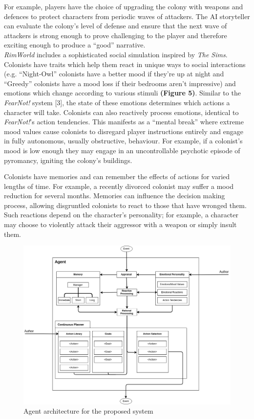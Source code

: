\documentclass{sig-alternate-05-2015}
\begin{document}
For example, players have the choice of upgrading the colony with weapons and defences to protect characters from periodic waves of attackers. The AI storyteller can evaluate the colony's level of defense and ensure that the next wave of attackers is strong enough to prove challenging to the player and therefore exciting enough to produce a ``good'' narrative.\\

\textit{RimWorld} includes a sophisticated social simulation inspired by \textit{The Sims}. Colonists have traits which help them react in unique ways to social interactions (e.g. ``Night-Owl'' colonists have a better mood if they're up at night and ``Greedy'' colonists have a mood loss if their bedrooms aren't impressive) and emotions which change according to various stimuli \textbf{(Figure 5)}. Similar to the \textit{FearNot!} system [3], the state of these emotions determines which actions a character will take. Colonists can also reactively process emotions, identical to \textit{FearNot!}'s action tendencies. This manifests as a ``mental break'' where extreme mood values cause colonists to disregard player instructions entirely and engage in fully autonomous, usually obstructive, behaviour. For example, if a colonist's mood is low enough they may engage in an uncontrollable psychotic episode of pyromancy, igniting the colony's buildings.

Colonists have memories and can remember the effects of actions for varied lengths of time. For example, a recently divorced colonist may suffer a mood reduction for several months. Memories can influence the decision making process, allowing disgruntled colonists to react to those that have wronged them. Such reactions depend on the character's personality; for example, a character may choose to violently attack their aggressor with a weapon or simply insult them.

\begin{figure}[!b]
\centering
\includegraphics[scale=0.4]{Images/AgentArchitecture.png}
\caption{Agent architecture for the proposed system}
\end{figure}
\end{document}
